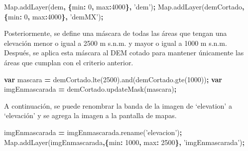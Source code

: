 \documentclass[
]{article}
\newenvironment{Shaded}{\begin{snugshade}}{\end{snugshade}}
\newcommand{\AttributeTok}[1]{\textcolor[rgb]{0.77,0.63,0.00}{#1}}
\newcommand{\DataTypeTok}[1]{\textcolor[rgb]{0.13,0.29,0.53}{#1}}
\newcommand{\DecValTok}[1]{\textcolor[rgb]{0.00,0.00,0.81}{#1}}
\newcommand{\KeywordTok}[1]{\textcolor[rgb]{0.13,0.29,0.53}{\textbf{#1}}}
\newcommand{\NormalTok}[1]{#1}
\newcommand{\OperatorTok}[1]{\textcolor[rgb]{0.81,0.36,0.00}{\textbf{#1}}}
\newcommand{\StringTok}[1]{\textcolor[rgb]{0.31,0.60,0.02}{#1}}
\newcommand{\VariableTok}[1]{\textcolor[rgb]{0.00,0.00,0.00}{#1}}
\begin{document}
\begin{Shaded}
\begin{Highlighting}[]
\VariableTok{Map}\NormalTok{.}\AttributeTok{addLayer}\NormalTok{(dem}\OperatorTok{,} \OperatorTok{\{}\DataTypeTok{min}\OperatorTok{:} \DecValTok{0}\OperatorTok{,} \DataTypeTok{max}\OperatorTok{:}\DecValTok{4000}\OperatorTok{\},} \StringTok{'dem'}\NormalTok{)}\OperatorTok{;}
\VariableTok{Map}\NormalTok{.}\AttributeTok{addLayer}\NormalTok{(demCortado}\OperatorTok{,} \OperatorTok{\{}\DataTypeTok{min}\OperatorTok{:} \DecValTok{0}\OperatorTok{,} \DataTypeTok{max}\OperatorTok{:}\DecValTok{4000}\OperatorTok{\},} \StringTok{'demMX'}\NormalTok{)}\OperatorTok{;}
\end{Highlighting}
\end{Shaded}

Posteriormente, se define una máscara de todas las áreas que tengan una
elevación menor o igual a 2500 m s.n.m. y mayor o igual a 1000 m s.n.m.
Después, se aplica esta máscara al DEM cotado para mantener únicamente
las áreas que cumplan con el criterio anterior.

\begin{Shaded}
\begin{Highlighting}[]
\KeywordTok{var}\NormalTok{ mascara }\OperatorTok{=} \VariableTok{demCortado}\NormalTok{.}\AttributeTok{lte}\NormalTok{(}\DecValTok{2500}\NormalTok{).}\AttributeTok{and}\NormalTok{(}\VariableTok{demCortado}\NormalTok{.}\AttributeTok{gte}\NormalTok{(}\DecValTok{1000}\NormalTok{))}\OperatorTok{;}
\KeywordTok{var}\NormalTok{ imgEnmascarada }\OperatorTok{=} \VariableTok{demCortado}\NormalTok{.}\AttributeTok{updateMask}\NormalTok{(mascara)}\OperatorTok{;}
\end{Highlighting}
\end{Shaded}

A continuación, se puede renombrar la banda de la imagen de `elevation'
a `elevación' y se agrega la imagen a la pantalla de mapas.

\begin{Shaded}
\begin{Highlighting}[]
\NormalTok{imgEnmascarada }\OperatorTok{=} \VariableTok{imgEnmascarada}\NormalTok{.}\AttributeTok{rename}\NormalTok{(}\StringTok{'elevacion'}\NormalTok{)}\OperatorTok{;}
\VariableTok{Map}\NormalTok{.}\AttributeTok{addLayer}\NormalTok{(imgEnmascarada}\OperatorTok{,\{}\DataTypeTok{min}\OperatorTok{:} \DecValTok{1000}\OperatorTok{,} \DataTypeTok{max}\OperatorTok{:} \DecValTok{2500}\OperatorTok{\},} \StringTok{'imgEnmascarada'}\NormalTok{)}\OperatorTok{;}
\end{Highlighting}
\end{Shaded}
\end{document}
